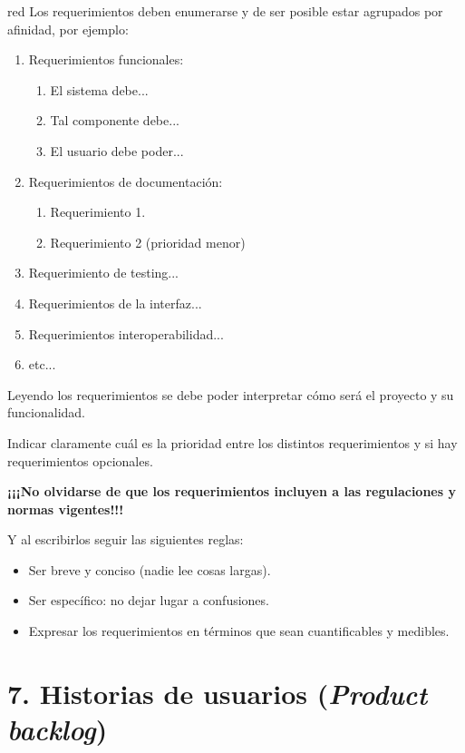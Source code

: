 \documentclass[
11pt, %
]{charter}
\begin{document}
\begin{consigna}{red}
Los requerimientos deben enumerarse y de ser posible estar agrupados por afinidad, por ejemplo:

\begin{enumerate}
	\item Requerimientos funcionales:
		\begin{enumerate}
			\item El sistema debe...
			\item Tal componente debe...
			\item El usuario debe poder...
		\end{enumerate}
	\item Requerimientos de documentación:
		\begin{enumerate}
			\item Requerimiento 1.
			\item Requerimiento 2 (prioridad menor)
		\end{enumerate}
	\item Requerimiento de testing...
	\item Requerimientos de la interfaz...
	\item Requerimientos interoperabilidad...
	\item etc...
\end{enumerate}

Leyendo los requerimientos se debe poder interpretar cómo será el proyecto y su funcionalidad.

Indicar claramente cuál es la prioridad entre los distintos requerimientos y si hay requerimientos opcionales. 

\textbf{¡¡¡No olvidarse de que los requerimientos incluyen a las regulaciones y normas vigentes!!!}

Y al escribirlos seguir las siguientes reglas:
\begin{itemize}
	\item Ser breve y conciso (nadie lee cosas largas). 
	\item Ser específico: no dejar lugar a confusiones.
	\item Expresar los requerimientos en términos que sean cuantificables y medibles.
\end{itemize}

\end{consigna}

\section{7. Historias de usuarios (\textit{Product backlog})}
\label{sec:backlog}
\end{document}
